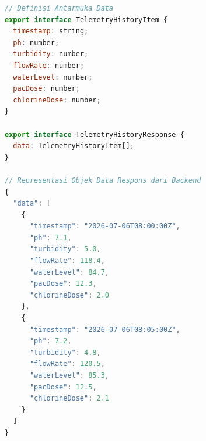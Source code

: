 \begin{minipage}{\textwidth}
\begin{lstlisting}[caption={Kontrak antarmuka struktur data dan representasi objek respons untuk riwayat sensor}, label={lst:telemetry-history}, frame=single, captionpos=t, language=JavaScript]
// Definisi Antarmuka Data
export interface TelemetryHistoryItem {
  timestamp: string;
  ph: number;
  turbidity: number;
  flowRate: number;
  waterLevel: number;
  pacDose: number;
  chlorineDose: number;
}

export interface TelemetryHistoryResponse {
  data: TelemetryHistoryItem[];
}

// Representasi Objek Data Respons dari Backend
{
  "data": [
    {
      "timestamp": "2026-07-06T08:00:00Z",
      "ph": 7.1,
      "turbidity": 5.0,
      "flowRate": 118.4,
      "waterLevel": 84.7,
      "pacDose": 12.3,
      "chlorineDose": 2.0
    },
    {
      "timestamp": "2026-07-06T08:05:00Z",
      "ph": 7.2,
      "turbidity": 4.8,
      "flowRate": 120.5,
      "waterLevel": 85.3,
      "pacDose": 12.5,
      "chlorineDose": 2.1
    }
  ]
}
\end{lstlisting}
\end{minipage}
